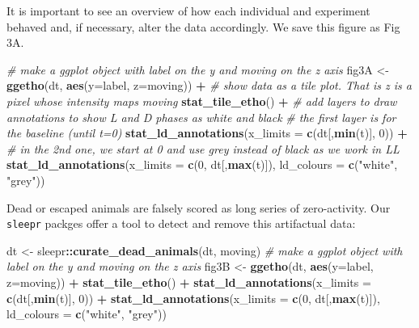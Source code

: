 \documentclass[]{article}
\newenvironment{Shaded}{\begin{snugshade}}{\end{snugshade}}
\newcommand{\CommentTok}[1]{\textcolor[rgb]{0.56,0.35,0.01}{\textit{#1}}}
\newcommand{\DataTypeTok}[1]{\textcolor[rgb]{0.13,0.29,0.53}{#1}}
\newcommand{\DecValTok}[1]{\textcolor[rgb]{0.00,0.00,0.81}{#1}}
\newcommand{\KeywordTok}[1]{\textcolor[rgb]{0.13,0.29,0.53}{\textbf{#1}}}
\newcommand{\NormalTok}[1]{#1}
\newcommand{\OperatorTok}[1]{\textcolor[rgb]{0.81,0.36,0.00}{\textbf{#1}}}
\newcommand{\StringTok}[1]{\textcolor[rgb]{0.31,0.60,0.02}{#1}}
\begin{document}
It is important to see an overview of how each individual and experiment
behaved and, if necessary, alter the data accordingly. We save this
figure as Fig 3A.

\begin{Shaded}
\begin{Highlighting}[]
\CommentTok{# make a ggplot object with label on the y and moving on the z axis}
\NormalTok{fig3A <-}\StringTok{ }\KeywordTok{ggetho}\NormalTok{(dt, }\KeywordTok{aes}\NormalTok{(}\DataTypeTok{y=}\NormalTok{label, }\DataTypeTok{z=}\NormalTok{moving)) }\OperatorTok{+}\StringTok{  }
\StringTok{  }\CommentTok{# show data as a tile plot. That is z is a pixel whose intensity maps moving}
\StringTok{  }\KeywordTok{stat_tile_etho}\NormalTok{() }\OperatorTok{+}\StringTok{                  }
\StringTok{  }\CommentTok{# add layers to draw annotations to show L and D phases as white and black}
\StringTok{  }\CommentTok{# the first layer is for the baseline (until t=0)}
\StringTok{  }\KeywordTok{stat_ld_annotations}\NormalTok{(}\DataTypeTok{x_limits =} \KeywordTok{c}\NormalTok{(dt[,}\KeywordTok{min}\NormalTok{(t)], }\DecValTok{0}\NormalTok{)) }\OperatorTok{+}
\StringTok{  }\CommentTok{# in the 2nd one, we start at 0 and use grey instead of black as we work in LL}
\StringTok{  }\KeywordTok{stat_ld_annotations}\NormalTok{(}\DataTypeTok{x_limits =} \KeywordTok{c}\NormalTok{(}\DecValTok{0}\NormalTok{, dt[,}\KeywordTok{max}\NormalTok{(t)]), }\DataTypeTok{ld_colours =} \KeywordTok{c}\NormalTok{(}\StringTok{"white"}\NormalTok{, }\StringTok{"grey"}\NormalTok{))}
\end{Highlighting}
\end{Shaded}

Dead or escaped animals are falsely scored as long series of
zero-activity. Our \texttt{sleepr} packges offer a tool to detect and
remove this artifactual data:

\begin{Shaded}
\begin{Highlighting}[]
\NormalTok{dt <-}\StringTok{ }\NormalTok{sleepr}\OperatorTok{::}\KeywordTok{curate_dead_animals}\NormalTok{(dt, moving)}
\CommentTok{# make a ggplot object with label on the y and moving on the z axis}
\NormalTok{fig3B <-}\StringTok{ }\KeywordTok{ggetho}\NormalTok{(dt, }\KeywordTok{aes}\NormalTok{(}\DataTypeTok{y=}\NormalTok{label, }\DataTypeTok{z=}\NormalTok{moving)) }\OperatorTok{+}\StringTok{  }
\StringTok{    }\KeywordTok{stat_tile_etho}\NormalTok{() }\OperatorTok{+}\StringTok{                  }
\StringTok{    }\KeywordTok{stat_ld_annotations}\NormalTok{(}\DataTypeTok{x_limits =} \KeywordTok{c}\NormalTok{(dt[,}\KeywordTok{min}\NormalTok{(t)], }\DecValTok{0}\NormalTok{)) }\OperatorTok{+}
\StringTok{    }\KeywordTok{stat_ld_annotations}\NormalTok{(}\DataTypeTok{x_limits =} \KeywordTok{c}\NormalTok{(}\DecValTok{0}\NormalTok{, dt[,}\KeywordTok{max}\NormalTok{(t)]), }\DataTypeTok{ld_colours =} \KeywordTok{c}\NormalTok{(}\StringTok{"white"}\NormalTok{, }\StringTok{"grey"}\NormalTok{))}
\end{Highlighting}
\end{Shaded}
\end{document}
